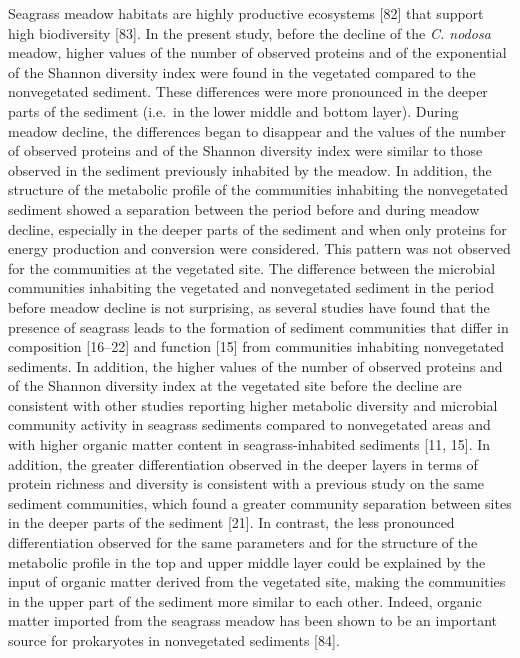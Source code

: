 \documentclass[
  12 pt,
]{article}
\begin{document}
Seagrass meadow habitats are highly productive ecosystems {[}82{]} that support high biodiversity {[}83{]}. In the present study, before the decline of the \emph{C. nodosa} meadow, higher values of the number of observed proteins and of the exponential of the Shannon diversity index were found in the vegetated compared to the nonvegetated sediment. These differences were more pronounced in the deeper parts of the sediment (i.e.~in the lower middle and bottom layer). During meadow decline, the differences began to disappear and the values of the number of observed proteins and of the Shannon diversity index were similar to those observed in the sediment previously inhabited by the meadow. In addition, the structure of the metabolic profile of the communities inhabiting the nonvegetated sediment showed a separation between the period before and during meadow decline, especially in the deeper parts of the sediment and when only proteins for energy production and conversion were considered. This pattern was not observed for the communities at the vegetated site. The difference between the microbial communities inhabiting the vegetated and nonvegetated sediment in the period before meadow decline is not surprising, as several studies have found that the presence of seagrass leads to the formation of sediment communities that differ in composition {[}16--22{]} and function {[}15{]} from communities inhabiting nonvegetated sediments. In addition, the higher values of the number of observed proteins and of the Shannon diversity index at the vegetated site before the decline are consistent with other studies reporting higher metabolic diversity and microbial community activity in seagrass sediments compared to nonvegetated areas and with higher organic matter content in seagrass-inhabited sediments {[}11, 15{]}. In addition, the greater differentiation observed in the deeper layers in terms of protein richness and diversity is consistent with a previous study on the same sediment communities, which found a greater community separation between sites in the deeper parts of the sediment {[}21{]}. In contrast, the less pronounced differentiation observed for the same parameters and for the structure of the metabolic profile in the top and upper middle layer could be explained by the input of organic matter derived from the vegetated site, making the communities in the upper part of the sediment more similar to each other. Indeed, organic matter imported from the seagrass meadow has been shown to be an important source for prokaryotes in nonvegetated sediments {[}84{]}.
\end{document}
